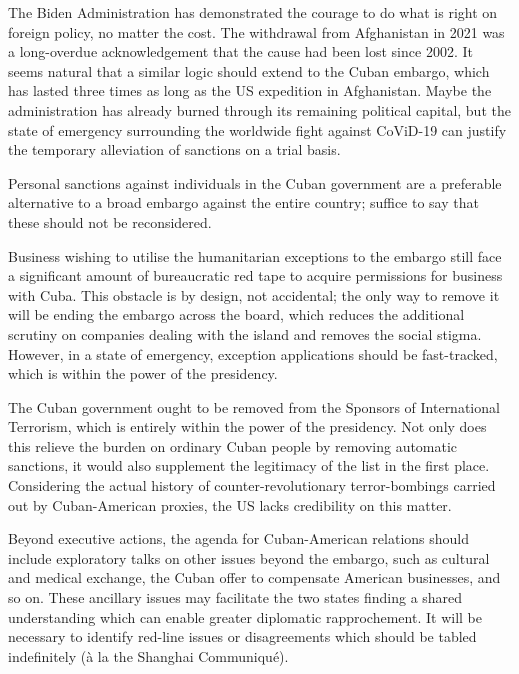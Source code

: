 \documentclass[letterpaper,12pt,twoside]{article} %
\begin{document}
\begin{multicols}{2}
The Biden Administration has demonstrated the courage to do what is right on foreign policy, no matter the cost. The withdrawal from Afghanistan in 2021 was a long-overdue acknowledgement that the cause had been lost since 2002. It seems natural that a similar logic should extend to the Cuban embargo, which has lasted three times as long as the US expedition in Afghanistan. Maybe the administration has already burned through its remaining political capital, but the state of emergency surrounding the worldwide fight against CoViD-19 can justify the temporary alleviation of sanctions on a trial basis.

Personal sanctions against individuals in the Cuban government are a preferable alternative to a broad embargo against the entire country; suffice to say that these should not be reconsidered.

Business wishing to utilise the humanitarian exceptions to the embargo still face a significant amount of bureaucratic red tape to acquire permissions for business with Cuba. This obstacle is by design, not accidental; the only way to remove it will be ending the embargo across the board, which reduces the additional scrutiny on companies dealing with the island and removes the social stigma. However, in a state of emergency, exception applications should be fast-tracked, which is within the power of the presidency.

The Cuban government ought to be removed from the Sponsors of International Terrorism, which is entirely within the power of the presidency. Not only does this relieve the burden on ordinary Cuban people by removing automatic sanctions, it would also supplement the legitimacy of the list in the first place. Considering the actual history of counter-revolutionary terror-bombings carried out by Cuban-American proxies, the US lacks credibility on this matter.

Beyond executive actions, the agenda for Cuban-American relations should include exploratory talks on other issues beyond the embargo, such as cultural and medical exchange, the Cuban offer to compensate American businesses, and so on. These ancillary issues may facilitate the two states finding a shared understanding which can enable greater diplomatic rapprochement. It will be necessary to identify red-line issues or disagreements which should be tabled indefinitely (à la the Shanghai Communiqué).

\end{multicols}
  \vfill
  \pagebreak


\printbibliography[heading=bibintoc,title=Bibliography]


\end{document}
